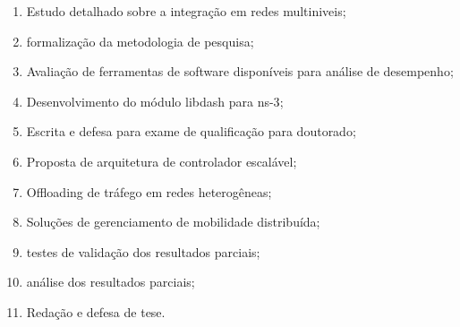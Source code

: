 
\begin{enumerate}
  

  \item Estudo detalhado sobre a integração em redes multiniveis;
	\item formalização da metodologia de pesquisa;
  \item Avaliação de ferramentas de software disponíveis para análise de desempenho;
  \item Desenvolvimento do módulo libdash para \ac{ns-3};
  \item Escrita e defesa para exame de qualificação para doutorado;
  \item Proposta de arquitetura de controlador escalável;
  \item Offloading de tráfego em redes heterogêneas;
  \item Soluções de gerenciamento de mobilidade distribuída;
  	\item testes de validação dos resultados parciais;
	\item análise dos resultados parciais;
  \item Redação e defesa de tese.

\end{enumerate}

